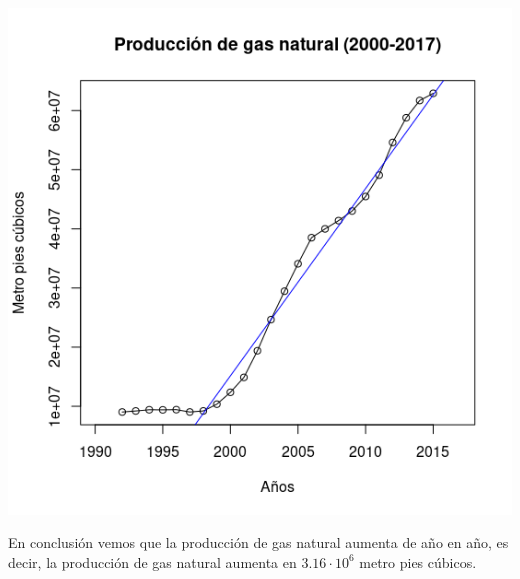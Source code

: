 \begin{multicols}{2}
\begin{center}
    \includegraphics[scale = 0.5]{codigoFuente/tareas/estadistica/imagenes/st.png}
\end{center}

En conclusión vemos que la producción de gas natural aumenta de año en año, es decir, la producción de gas natural aumenta en $3.16\cdot 10^6$ metro pies cúbicos.\\\\

\end{multicols}
